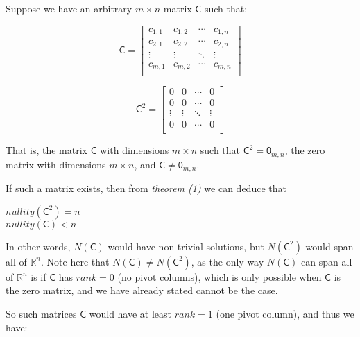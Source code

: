 \documentclass[a4paper, 11pt]{article}
\newcommand{\mat}[1]{\boldsymbol { \mathsf{#1}} }
\begin{document}
\begin{enumerate}
\begin{enumerate}[label=\alph*]
	    Suppose we have an arbitrary $m \times n$ matrix $\mat{C}$ such that:
	    
	    \begin{equation*}
	        \mat{C} =
	        \begin{bmatrix}
	        c_{1,1} & c_{1,2} & \cdots & c_{1,n}\\
	        c_{2,1} & c_{2,2} & \cdots & c_{2,n} \\
	        \vdots & \vdots & \ddots & \vdots \\
	        c_{m,1} & c_{m,2} & \cdots & c_{m,n} \\
	        \end{bmatrix}
	    \end{equation*}
	    
	    \begin{equation*}
	        \mat{C}^2 =
	        \begin{bmatrix}
	        0 & 0 & \cdots & 0 \\
	        0 & 0 & \cdots & 0 \\
	        \vdots & \vdots & \ddots & \vdots \\
	        0 & 0 & \cdots & 0 \\
	        \end{bmatrix}
	    \end{equation*}
	    
	    That is, the matrix $\mat{C}$ with dimensions $m \times n$ such that $\mat{C}^2 = \mat{0}_{m,n}$, the zero matrix with dimensions $m \times n$, and $\mat{C} \neq \mat{0}_{m,n}$.
	    
	    If such a matrix exists, then from \textit{theorem (1)} we can deduce that
	    \begin{center}
	     $nullity(\mat{C}^2) = n$ \\
	     $nullity(\mat{C}) < n$ \\
	    \end{center}
	   
	   In other words, $N(\mat{C})$ would have non-trivial solutions, but $N(\mat{C}^2)$ would span all of $\mathbb{R}^n$. Note here that $N(\mat{C}) \neq N(\mat{C}^2)$, as the only way $N(\mat{C})$ can span all of $\mathbb{R}^n$ is if $\mat{C}$ has $rank = 0$ (no pivot columns), which is only possible when $\mat{C}$ is the zero matrix, and we have already stated cannot be the case.
	    
	    So such matrices $\mat{C}$ would have at least $rank = 1$ (one pivot column), and thus we have:
	    

\end{enumerate}
\end{enumerate}
\end{document}
